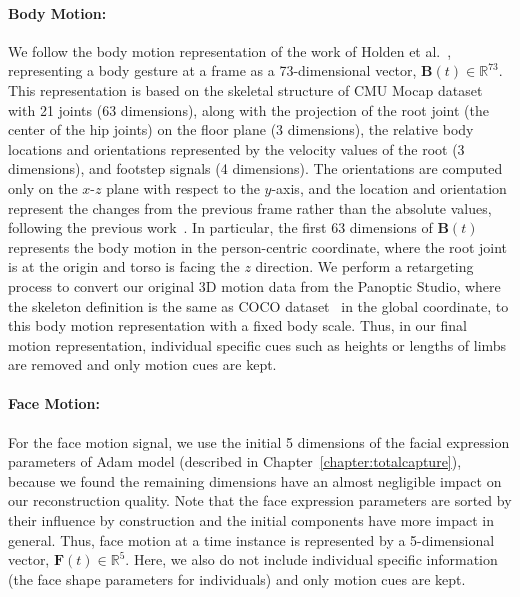 \paragraph{Body Motion:} We follow the body motion representation of the work of Holden et al.~\cite{holden2016deep}, representing a body gesture at a frame as a 73-dimensional vector, $\mathbf{B}(t) \in \mathbb{R}^{73}$. This representation is based on the skeletal structure of CMU Mocap dataset~\cite{gross2001cmu} with 21 joints (63 dimensions), along with the projection of the root joint (the center of the hip joints) on the floor plane (3 dimensions), the relative body locations and orientations represented by the velocity values of the root (3 dimensions), and footstep signals (4 dimensions). The orientations are computed only on the $x$-$z$ plane with respect to the $y$-axis, and the location and orientation represent the changes from the previous frame rather than the absolute values, following the previous work~\cite{jain2016structural, holden2016deep}. In particular, the first 63 dimensions of $\mathbf{B}(t)$ represents the body motion in the person-centric coordinate, where the root joint is at the origin and torso is facing the $z$ direction. We perform a retargeting process to convert our original 3D motion data from the Panoptic Studio, where the skeleton definition is the same as COCO dataset~\cite{coco-14} in the global coordinate, to this body motion representation with a fixed body scale. Thus, in our final motion representation, individual specific cues such as heights or lengths of limbs are removed and only motion cues are kept.

\paragraph{Face Motion:}  For the face motion signal, we use the initial 5 dimensions of the facial expression parameters of Adam model (described in Chapter~\ref{chapter:totalcapture}), because we found the remaining dimensions have an almost negligible impact on our reconstruction quality. Note that the face expression parameters are sorted by their influence by construction and the initial components have more impact in general. Thus, face motion at a time instance is represented by a 5-dimensional vector, $\mathbf{F}(t) \in \mathbb{R}^{5}$. Here, we also do not include individual specific information (the face shape parameters for individuals) and only motion cues are kept.
 
